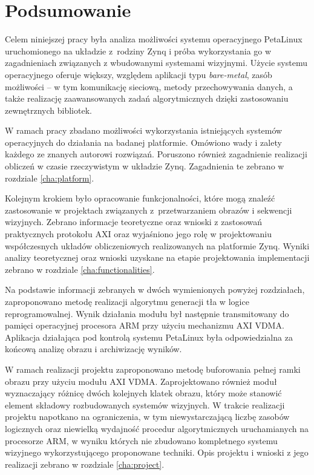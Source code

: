\chapter{Podsumowanie}
\label{chap:summary}




Celem niniejszej pracy była analiza możliwości systemu operacyjnego PetaLinux uruchomionego na układzie z~rodziny Zynq i próba wykorzystania go w zagadnieniach związanych z wbudowanymi systemami wizyjnymi. 
Użycie systemu operacyjnego oferuje większy, względem aplikacji typu \textit{bare-metal}, zasób możliwości -- w tym komunikację sieciową, metody przechowywania danych, a także realizację zaawansowanych zadań algorytmicznych dzięki zastosowaniu zewnętrznych bibliotek. 

W ramach pracy zbadano możliwości wykorzystania istniejących systemów operacyjnych do działania na badanej platformie. 
Omówiono wady i zalety każdego ze znanych autorowi rozwiązań. 
Poruszono również zagadnienie realizacji obliczeń w czasie rzeczywistym w układzie Zynq. 
Zagadnienia te zebrano w rozdziale \ref{cha:platform}. %

Kolejnym krokiem było opracowanie funkcjonalności, które mogą znaleźć zastosowanie w projektach związanych z~przetwarzaniem obrazów i sekwencji wizyjnych. 
Zebrano informacje teoretyczne oraz wnioski z zastosowań praktycznych protokołu AXI oraz wyjaśniono jego rolę w projektowaniu współczesnych układów obliczeniowych realizowanych na platformie Zynq.
Wyniki analizy teoretycznej oraz wnioski uzyskane na etapie projektowania implementacji zebrano w rozdziale \ref{cha:functionalities}. 

Na podstawie informacji zebranych w dwóch wymienionych powyżej rozdziałach, zaproponowano metodę realizacji algorytmu generacji tła w logice reprogramowalnej. %
Wynik działania modułu był następnie transmitowany do pamięci operacyjnej procesora ARM przy użyciu mechanizmu AXI VDMA. 
Aplikacja działająca pod kontrolą systemu PetaLinux była odpowiedzialna za końcową analizę obrazu i archiwizację wyników.

W ramach realizacji projektu zaproponowano metodę buforowania pełnej ramki obrazu przy użyciu modułu AXI VDMA. 
Zaprojektowano również moduł wyznaczający różnicę dwóch kolejnych klatek obrazu, który może stanowić element składowy rozbudowanych systemów wizyjnych.
W trakcie realizacji projektu napotkano na ograniczenia, w tym niewystarczającą liczbę zasobów logicznych oraz niewielką wydajność procedur algorytmicznych uruchamianych na procesorze ARM, w wyniku których nie zbudowano kompletnego systemu wizyjnego wykorzystującego proponowane techniki.
Opis projektu i wnioski z jego realizacji zebrano w rozdziale \ref{cha:project}.

